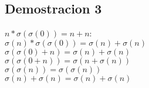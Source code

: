 \documentclass[10pt,a4paper]{article}
\begin{document}
        \subsection{Demostracion 3}
        \begin{center}
        $n * \sigma(\sigma(0)) = n + n$:\\
        $\sigma(n) * \sigma(\sigma(0)) = \sigma(n) + \sigma(n)$\\
        $\sigma(\sigma(0) + n) =  \sigma(n) + \sigma(n)$\\
        $\sigma(\sigma(0+n)) = \sigma(n + \sigma(n))$\\
        $\sigma(\sigma(n)) = \sigma(\sigma(n))$\\
        $\sigma(n) + \sigma(n) = \sigma(n) + \sigma(n)$
        \end{center}
        
    
\end{document}
